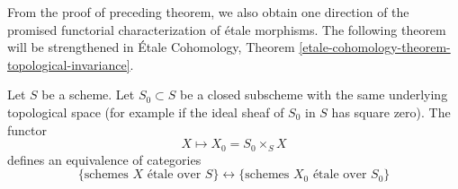 \noindent
From the proof of preceding theorem, we also obtain one direction of the
promised functorial characterization of \'etale morphisms. The following
theorem will be strengthened in
\'Etale Cohomology,
Theorem \ref{etale-cohomology-theorem-topological-invariance}.

\begin{theorem}
\label{theorem-remarkable-equivalence}
\begin{reference}
\cite[IV, Theorem 18.1.2]{EGA}
\end{reference}
Let $S$ be a scheme.
Let $S_0 \subset S$ be a closed subscheme with the same underlying
topological space (for example if the ideal sheaf of $S_0$ in $S$
has square zero). The functor
$$
X \longmapsto X_0 = S_0 \times_S X
$$
defines an equivalence of categories
$$
\{
\text{schemes }X\text{ \'etale over }S
\}
\leftrightarrow
\{
\text{schemes }X_0\text{ \'etale over }S_0
\}
$$
\end{theorem}

